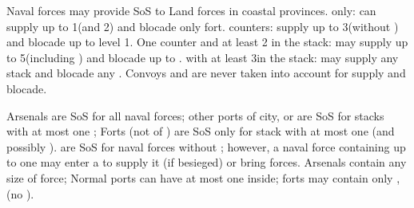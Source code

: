Naval forces may provide SoS to Land forces in coastal provinces.
\bparag \de only: can supply up to 1\LD (and 2\LDE) and blocade only fort.
\bparag \ND counters: supply up to 3\LD (without \ARMY) and blocade up to
\fortress level 1.
\bparag One \FLEET counter and at least 2 \ND in the stack: may supply up to
5\LD (including \ARMY) and blocade up to .
%
\bparag \FLEET\faceplus with at least 3\ND in the stack: may supply any stack
and blocade any \fortress.
\bparag Convoys and are never taken into account for supply and blocade.

Arsenals are SoS for all naval forces; other ports of city, \COL or \TP are SoS for 
stacks with at most one \FLEET; 
\bparag Forts (not of \TP) are SoS only for stack with at most one \ND 
(and possibly \NDE).
\bparag \Presidios are SoS for naval forces without \FLEET;
however, a naval force containing up to one \FLEET may enter a 
\Presidio to supply it (if besieged) or bring forces.
\bparag[Stacking:] Arsenals contain any size of force;
Normal ports can have at most one \FLEET inside;
forts may contain only \ND, \NDE (no \FLEET).

